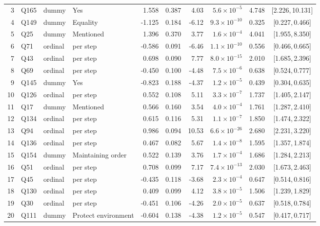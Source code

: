 \begin{landscape}
\begin{longtable}{r l l l r r r r r c}
3 & Q165 & dummy & Yes & 1.558 & 0.387 & 4.03 & $5.6{\times}10^{-5}$ & 4.748 & [2.226,\,10.131] &  \\
4 & Q149 & dummy & Equality & -1.125 & 0.184 & -6.12 & $9.3{\times}10^{-10}$ & 0.325 & [0.227,\,0.466] &  \\
5 & Q25 & dummy & Mentioned & 1.396 & 0.370 & 3.77 & $1.6{\times}10^{-4}$ & 4.041 & [1.955,\,8.350] &  \\
6 & Q71 & ordinal & per step & -0.586 & 0.091 & -6.46 & $1.1{\times}10^{-10}$ & 0.556 & [0.466,\,0.665] &  \\
7 & Q43 & ordinal & per step & 0.698 & 0.090 & 7.77 & $8.0{\times}10^{-15}$ & 2.010 & [1.685,\,2.396] &  \\
8 & Q69 & ordinal & per step & -0.450 & 0.100 & -4.48 & $7.5{\times}10^{-6}$ & 0.638 & [0.524,\,0.777] &  \\
9 & Q145 & dummy & Yes & -0.823 & 0.188 & -4.37 & $1.2{\times}10^{-5}$ & 0.439 & [0.304,\,0.635] &  \\
10 & Q126 & ordinal & per step & 0.552 & 0.108 & 5.11 & $3.3{\times}10^{-7}$ & 1.737 & [1.405,\,2.147] &  \\
11 & Q17 & dummy & Mentioned & 0.566 & 0.160 & 3.54 & $4.0{\times}10^{-4}$ & 1.761 & [1.287,\,2.410] &  \\
12 & Q134 & ordinal & per step & 0.615 & 0.116 & 5.31 & $1.1{\times}10^{-7}$ & 1.850 & [1.474,\,2.322] &  \\
13 & Q94 & ordinal & per step & 0.986 & 0.094 & 10.53 & $6.6{\times}10^{-26}$ & 2.680 & [2.231,\,3.220] &  \\
14 & Q136 & ordinal & per step & 0.467 & 0.082 & 5.67 & $1.4{\times}10^{-8}$ & 1.595 & [1.357,\,1.874] &  \\
15 & Q154 & dummy & Maintaining order & 0.522 & 0.139 & 3.76 & $1.7{\times}10^{-4}$ & 1.686 & [1.284,\,2.213] &  \\
16 & Q51 & ordinal & per step & 0.708 & 0.099 & 7.17 & $7.4{\times}10^{-13}$ & 2.030 & [1.673,\,2.463] &  \\
17 & Q45 & ordinal & per step & -0.435 & 0.118 & -3.68 & $2.3{\times}10^{-4}$ & 0.647 & [0.514,\,0.816] &  \\
18 & Q130 & ordinal & per step & 0.409 & 0.099 & 4.12 & $3.8{\times}10^{-5}$ & 1.506 & [1.239,\,1.829] &  \\
19 & Q30 & ordinal & per step & -0.451 & 0.106 & -4.26 & $2.0{\times}10^{-5}$ & 0.637 & [0.518,\,0.784] &  \\
20 & Q111 & dummy & Protect environment & -0.604 & 0.138 & -4.38 & $1.2{\times}10^{-5}$ & 0.547 & [0.417,\,0.717] &  \\

\end{longtable}
\end{landscape}
